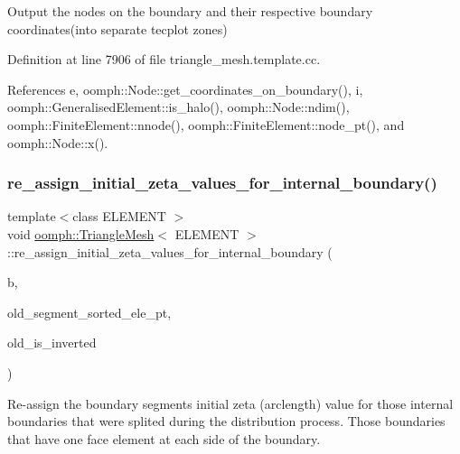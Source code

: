 Output the nodes on the boundary and their respective boundary coordinates(into separate tecplot zones) 

Definition at line 7906 of file triangle\+\_\+mesh.\+template.\+cc.



References e, oomph\+::\+Node\+::get\+\_\+coordinates\+\_\+on\+\_\+boundary(), i, oomph\+::\+Generalised\+Element\+::is\+\_\+halo(), oomph\+::\+Node\+::ndim(), oomph\+::\+Finite\+Element\+::nnode(), oomph\+::\+Finite\+Element\+::node\+\_\+pt(), and oomph\+::\+Node\+::x().

\mbox{\label{classoomph_1_1TriangleMesh_a614bf8ce3f64b37924a0b02fc5bab8eb}} 
\subsubsection{\texorpdfstring{re\+\_\+assign\+\_\+initial\+\_\+zeta\+\_\+values\+\_\+for\+\_\+internal\+\_\+boundary()}{re\_assign\_initial\_zeta\_values\_for\_internal\_boundary()}}
{\footnotesize\ttfamily template$<$class E\+L\+E\+M\+E\+NT $>$ \\
void \hyperlink{classoomph_1_1TriangleMesh}{oomph\+::\+Triangle\+Mesh}$<$ E\+L\+E\+M\+E\+NT $>$\+::re\+\_\+assign\+\_\+initial\+\_\+zeta\+\_\+values\+\_\+for\+\_\+internal\+\_\+boundary (\begin{DoxyParamCaption}\item[{const unsigned \&}]{b,  }\item[{\hyperlink{classoomph_1_1Vector}{Vector}$<$ std\+::list$<$ \hyperlink{classoomph_1_1FiniteElement}{Finite\+Element} $\ast$$>$ $>$ \&}]{old\+\_\+segment\+\_\+sorted\+\_\+ele\+\_\+pt,  }\item[{std\+::map$<$ \hyperlink{classoomph_1_1FiniteElement}{Finite\+Element} $\ast$, bool $>$ \&}]{old\+\_\+is\+\_\+inverted }\end{DoxyParamCaption})}



Re-\/assign the boundary segments initial zeta (arclength) value for those internal boundaries that were splited during the distribution process. Those boundaries that have one face element at each side of the boundary. 

